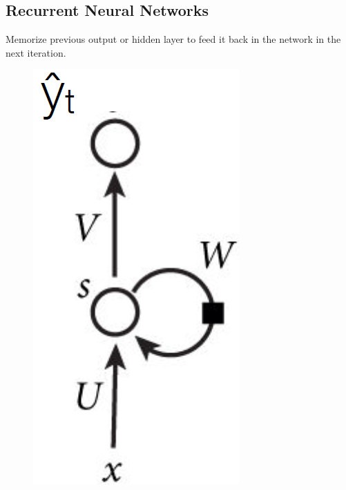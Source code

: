 \subsection*{Recurrent Neural Networks}
Memorize previous output or hidden layer to feed it back in the network in the next iteration.
\setlength{\intextsep}{-5pt}
\begin{figure}
    \includegraphics[width=\linewidth]{images/BPTT.png}
\end{figure}
